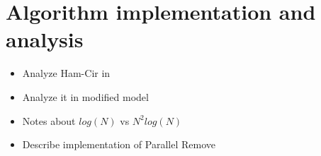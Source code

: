 \section{Algorithm implementation and analysis} \label{algo}
\begin{itemize}
	\item Analyze Ham-Cir in \cite{Katsanyi:2003}
	\item Analyze it in modified model
	\item Notes about $log(N)$ vs $N^2 log(N)$
	\item Describe implementation of Parallel Remove
\end{itemize}